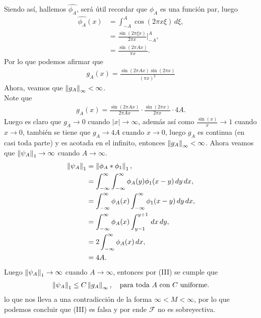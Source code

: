 \begin{homeworkProblem}
\begin{solution}
\begin{enumerate}[(i)]
\begin{align*}
        \end{align*}
        Siendo así, hallemos $\hat{\phi_{A}}$, será útil recordar que $\phi_{A}$ es una función par, luego
        \begin{align*}
          \hat{\phi_{A}}(x)&=\int_{-A}^{A}\cos(2\pi x\xi)\, d\xi,\\
          &=\frac{\sin(2\pi \xi x)}{2\pi x}\Bigg|_{-A}^{A},\\
          &=\frac{\sin(2\pi Ax)}{\pi x}.
        \end{align*}
        Por lo que podemos afirmar que
        \begin{align*}
          g_{A}(x)=\frac{\sin(2\pi Ax)\sin(2\pi x)}{(\pi x)^2}
        \end{align*}
        Ahora, veamos que $\left\|g_A\right\|_{\infty}<\infty$.\\
        Note que
        \begin{align*}
          g_{A}(x)=\frac{\sin(2\pi Ax)}{2\pi Ax}\cdot\frac{\sin(2\pi x)}{2\pi x}\cdot 4A.
        \end{align*}
        Luego es claro que $g_{A}\to 0$ cuando $|x|\to\infty$, además así como $\frac{\sin(x)}{x}\to 1$ cuando $x\to 0$, también se tiene que $g_{A}\to 4A$ cuando $x\to 0$, luego $g_{A}$ es continua (en casi toda parte) y es acotada en el infinito, entonces $\left\|g_{A}\right\|_{\infty}<\infty$.
        Ahora veamos que $\left\|\psi_{A}\right\|_{1}\to\infty$ cuando $A\to \infty$.\\
        \begin{align*}
          \left\|\psi_{A}\right\|_{1}&=\left\|\phi_{A}*\phi_{1}\right\|_{1},\\
          &=\int_{-\infty}^{\infty}\int_{-\infty}^{\infty}\phi_{A}(y)\phi_{1}(x-y)\, dy\, dx,\\
          &=\int_{-\infty}^{\infty}\phi_{A}(x)\int_{-\infty}^{\infty}\phi_{1}(x-y)\, dy\, dx,\\
          &=\int_{-\infty}^{\infty}\phi_{A}(x)\int_{y-1}^{y+1}\, dx\, dy,\\
          &=2\int_{-\infty}^{\infty}\phi_{A}(x)\, dx,\\
          &=4A.
        \end{align*}
        Luego $\left\|\psi_{A}\right\|_{1}\to \infty$ cuando $A\to \infty$, entonces por (III) se cumple que
        \begin{align*}
          \left\|\psi_A\right\|_{1}\leq C\left\|g_A\right\|_{\infty},\quad\text{para toda $A$ con $C$ uniforme.}
        \end{align*}
        lo que nos lleva a una contradicción de la forma $\infty < M < \infty$, por lo que podemos concluir que (III) es falsa y por ende $\mathcal{F}$ no es sobreyectiva. 
    \end{enumerate}
  \end{solution}
\end{homeworkProblem}
